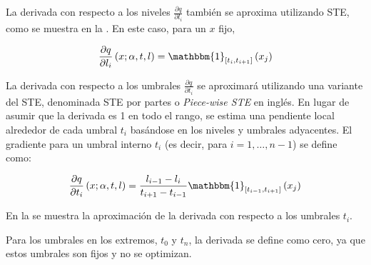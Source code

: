 
La derivada con respecto a los niveles $\frac{\partial q}{\partial l_i}$ también se aproxima utilizando STE, como se muestra en la . En este caso, para un $x$ fijo,


\begin{equation}
\label{eq:flexible_quantizer_dq_dl}
\frac{\partial q}{\partial l_i} \left(x; \alpha, t, l\right) = \mathbbm{1}_{\left[t_i, t_{i+1}\right]} \left(x_j\right)
\end{equation}

La derivada con respecto a los umbrales  $\frac{\partial q}{\partial t_i}$ se aproximará utilizando una variante del STE, denominada STE por partes o \textit{Piece-wise STE} en inglés. En lugar de asumir que la derivada es 1 en todo el rango, se estima una pendiente local alrededor de cada umbral $t_i$ basándose en los niveles y umbrales adyacentes. El gradiente para un umbral interno $t_i$ (es decir, para $i=1,\ldots,n-1$) se define como:

\begin{equation}
\label{eq:flexible_quantizer_dq_dt}
\frac{\partial q}{\partial t_i} \left(x; \alpha, t, l\right) = \frac{l_{i-1} - l_i}{t_{i+1} - t_{i-1}}\mathbbm{1}_{\left[t_{i-1}, t_{i+1}\right]} \left(x_j\right)
\end{equation}

En la  se muestra la aproximación de la derivada con respecto a los umbrales $t_i$.


Para los umbrales en los extremos, $t_0$ y $t_n$, la derivada se define como cero, ya que estos umbrales son fijos y no se optimizan.
